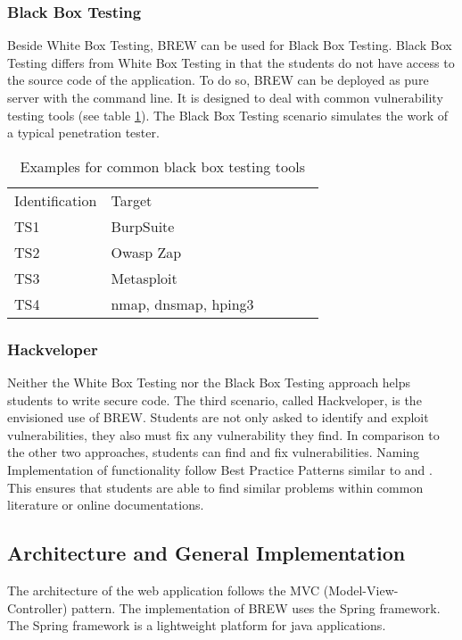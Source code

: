 \documentclass{llncs}
\begin{document}
\subsubsection{Black Box Testing}
Beside White Box Testing, BREW can be used for Black Box Testing. Black Box Testing differs from White Box Testing in that the students do not have access to the source code of the application.  To do so, BREW can be deployed as pure server with the command line. It is designed to deal with common vulnerability testing tools (see table \ref{tab:ostools}). The Black Box Testing scenario simulates the work of a typical penetration tester.

\begin{table}
\centering
\caption{Examples for common black box testing tools}
\label{tab:ostools}
\begin{tabular}{llllll}
\hline\noalign{\smallskip}
Identification & Target\\
\noalign{\smallskip}
\hline
\noalign{\smallskip}
TS1 & BurpSuite\\
TS2 & Owasp Zap\\
TS3 & Metasploit\\
TS4 & nmap, dnsmap, hping3\\
\hline
\end{tabular}
\end{table}

\subsubsection{Hackveloper}
Neither the White Box Testing nor the Black Box Testing approach helps students to write secure code. The third scenario, called Hackveloper, is the envisioned use of BREW. Students are not only asked to identify and exploit vulnerabilities, they also must fix any vulnerability they find. In comparison to the other two approaches, students can find and fix vulnerabilities. Naming Implementation of functionality follow Best Practice Patterns similar to  \cite{meucci2008owasp,van2008owasp,vanderstock2014} and \cite{springdoc2014}. This ensures that students are able to find similar problems within common literature or online documentations.




\subsection{Architecture and General Implementation}
The architecture of the web application follows the MVC (Model-View-Controller) pattern.
The implementation of BREW uses the Spring \cite{spring2014} framework.
The Spring framework is a lightweight platform for java applications.
\end{document}
